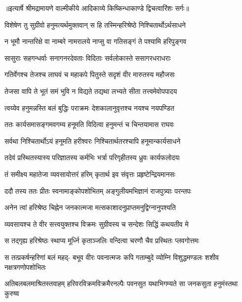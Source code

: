 {॥इत्यार्षे श्रीमद्रामायणे वाल्मीकीये आदिकाव्ये किष्किन्धाकाण्डे द्विचत्वारिंशः सर्गः॥}


\twolineshloka
{विशेषेण तु सुग्रीवो हनुमत्यर्थमुक्तवान्}
{स हि तस्मिन्हरिश्रेष्ठे निश्चितार्थोऽर्थसाधने} %

\twolineshloka
{न भूमौ नान्तरिक्षे वा नाम्बरे नामरालये}
{नाप्सु वा गतिसङ्गं ते पश्यामि हरिपुङ्गव} %

\twolineshloka
{सासुराः सहगन्धर्वाः सनागनरदेवताः}
{विदिताः सर्वलोकास्ते ससागरधराधराः} %

\twolineshloka
{गतिर्वेगश्च तेजश्च लाघवं च महाकपे}
{पितुस्ते सदृशं वीर मारुतस्य महौजसः} %

\twolineshloka
{तेजसा वापि ते भूतं समं भुवि न विद्यते}
{तद्यथा लभ्यते सीता तत्त्वमेवोपपादय} %

\twolineshloka
{त्वय्येव हनुमन्नस्ति बलं बुद्धिः पराक्रमः}
{देशकालानुवृत्तश्च नयश्च नयपण्डित} %

\twolineshloka
{ततः कार्यसमासङ्गमवगम्य हनूमति}
{विदित्वा हनुमन्तं च चिन्तयामास राघवः} %

\twolineshloka
{सर्वथा निश्चितार्थोऽयं हनूमति हरीश्वरः}
{निश्चितार्थतरश्चापि हनूमान्कार्यसाधने} %

\twolineshloka
{तदेवं प्रस्थितस्यास्य परिज्ञातस्य कर्मभिः}
{भर्त्रा परिगृहीतस्य ध्रुवः कार्यफलोदयः} %

\twolineshloka
{तं समीक्ष्य महातेजा व्यवसायोत्तरं हरिम्}
{कृतार्थ इव संवृत्तः प्रहृष्टेन्द्रियमानसः} %

\twolineshloka
{ददौ तस्य ततः प्रीतः स्वनामाङ्कोपशोभितम्}
{अङ्गुलीयमभिज्ञानं राजपुत्र्याः परन्तपः} %

\twolineshloka
{अनेन त्वां हरिश्रेष्ठ चिह्नेन जनकात्मजा}
{मत्सकाशादनुप्राप्तमनुद्विग्नानुपश्यति} %

\twolineshloka
{व्यवसायश्च ते वीर सत्त्वयुक्तश्च विक्रमः}
{सुग्रीवस्य च सन्देशः सिद्धिं कथयतीव मे} %

\twolineshloka
{स तद्गृह्य हरिश्रेष्ठः स्थाप्य मूर्ध्नि कृताञ्जलिः}
{वन्दित्वा चरणौ चैव प्रस्थितः प्लवगोत्तमः} %

\fourlineindentedshloka
{स तत्प्रकर्षन्हरिणां बलं महद्-}
{बभूव वीरः पवनात्मजः कपि}
{गताम्बुदे व्योम्नि विशुद्धमण्डलः}
{शशीव नक्षत्रगणोपशोभितः} %

\fourlineindentedshloka
{अतिबलबलमाश्रितस्तवाहम्}
{हरिवरविक्रमविक्रमैरनल्पैः}
{पवनसुत यथाभिगम्यते सा}
{जनकसुता हनुमंस्तथा कुरुष्व} %


